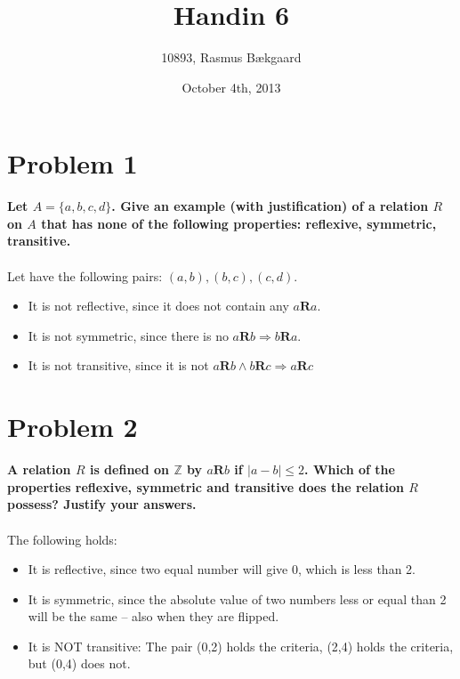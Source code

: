 \documentclass[english,11pt,a4paper]{article}
\title{Handin 6}
\author{10893, Rasmus Bækgaard}
\date{October 4th, 2013}
\begin{document}
\maketitle

\section*{Problem 1}
\textbf{Let $A= \{ a, b, c, d\}$. Give an example (with justification) of a relation $R$ on $A$ that has none of the following properties: reflexive, symmetric, transitive.}
\\
\\
Let have the following pairs: $(a,b), (b,c), (c,d)$.
\begin{itemize}
\item It is not reflective, since it does not contain any $a\textbf{R}a$.
\item It is not symmetric, since there is no $a\textbf{R}b \Rightarrow b\textbf{R}a$.
\item It is not transitive, since it is not $a\textbf{R}b \wedge b\textbf{R}c \Rightarrow a\textbf{R}c$

\end{itemize}


\section*{Problem 2}
\textbf{A relation $R$ is defined on $\mathbb{Z}$ by $a\textbf{R}b$ if $|a-b| \leq 2$. Which of the properties reflexive, symmetric and transitive does the relation $R$ possess? Justify your answers.}
\\
\\
The following holds:
\begin{itemize}
\item It is reflective, since two equal number will give 0, which is less than 2.
\item It is symmetric, since the absolute value of two numbers less or equal than 2 will be the same -- also when they are flipped.
\item It is NOT transitive: The pair (0,2) holds the criteria, (2,4) holds the criteria, but (0,4) does not. 
\end{itemize}
\end{document}
